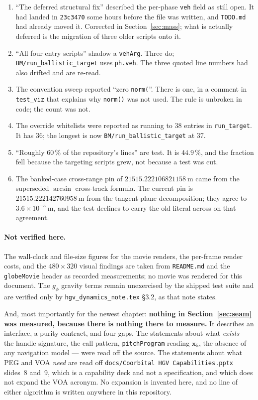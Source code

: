 \documentclass[11pt]{article}
\newcommand{\code}[1]{\texttt{#1}}
\begin{document}
\begin{enumerate}
\item ``The deferred structural fix'' described the per-phase \code{veh} field
as still open. It had landed in \code{23c3470} some hours before the file was
written, and \code{TODO.md} had already moved it. Corrected in
Section~\ref{sec:mass}; what is actually deferred is the migration of three
older scripts onto it.
\item ``All four entry scripts'' shadow a \code{vehArg}. Three do;
\code{BM/run\_ballistic\_target} uses \code{ph.veh}. The three quoted line
numbers had also drifted and are re-read.
\item The convention sweep reported ``zero \code{norm(}''. There is one, in a
comment in \code{test\_viz} that explains why \code{norm()} was not used. The
rule is unbroken in code; the count was not.
\item The override whitelists were reported as running to 38 entries in
\code{run\_target}. It has 36; the longest is now
\code{BM/run\_ballistic\_target} at 37.
\item ``Roughly $60\,\%$ of the repository's lines'' are test. It is
$44.9\,\%$, and the fraction fell because the targeting scripts grew, not
because a test was cut.
\item The banked-case cross-range pin of $21515.222106821158~\mathrm{m}$ came
from the superseded $\arcsin$ cross-track formula. The current pin is
$21515.222142760958~\mathrm{m}$ from the tangent-plane decomposition; they
agree to $3.6\times10^{-5}~\mathrm{m}$, and the test declines to carry the old
literal across on that agreement.
\end{enumerate}

\paragraph{Not verified here.} The wall-clock and file-size figures for the
movie renders, the per-frame render costs, and the $480\times320$ visual
findings are taken from \code{README.md} and the \code{globeMovie} header as
recorded measurements; no movie was rendered for this document. The
$g_\phi$ gravity terms remain unexercised by the shipped test suite and are
verified only by \code{hgv\_dynamics\_note.tex} \S3.2, as that note states.

And, most importantly for the newest chapter: \textbf{nothing in
Section~\ref{sec:seam} was measured, because there is nothing there to
measure.} It describes an interface, a purity contract, and four gaps. The
statements about what \emph{exists} --- the handle signature, the call pattern,
\code{pitchProgram} reading $\mathbf{x}_5$, the absence of any navigation model
--- were read off the source. The statements about what PEG and VOA
\emph{need} are read off \code{docs/Coorbital HGV Capabilities.pptx} slides~8
and~9, which is a capability deck and not a specification, and which does not
expand the VOA acronym. No expansion is invented here, and no line of either
algorithm is written anywhere in this repository.
\end{document}
